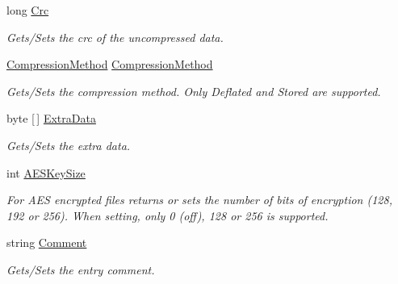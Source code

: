 \begin{DoxyCompactItemize}
long \hyperlink{class_i_c_sharp_code_1_1_sharp_zip_lib_1_1_zip_1_1_zip_entry_ac4fb0517f47ac39edf30324447ae3e5a}{Crc}
\begin{DoxyCompactList}\small\item\em Gets/\+Sets the crc of the uncompressed data. \end{DoxyCompactList}\item 
\hyperlink{namespace_i_c_sharp_code_1_1_sharp_zip_lib_1_1_zip_a90a0e174eca72bf6b490bae40d83a09e}{Compression\+Method} \hyperlink{class_i_c_sharp_code_1_1_sharp_zip_lib_1_1_zip_1_1_zip_entry_a1c4996433278e904adf2b5a6fe8718c0}{Compression\+Method}
\begin{DoxyCompactList}\small\item\em Gets/\+Sets the compression method. Only Deflated and Stored are supported. \end{DoxyCompactList}\item 
byte \mbox{[}$\,$\mbox{]} \hyperlink{class_i_c_sharp_code_1_1_sharp_zip_lib_1_1_zip_1_1_zip_entry_a1536284d87283e6c784f005460f71943}{Extra\+Data}
\begin{DoxyCompactList}\small\item\em Gets/\+Sets the extra data. \end{DoxyCompactList}\item 
int \hyperlink{class_i_c_sharp_code_1_1_sharp_zip_lib_1_1_zip_1_1_zip_entry_a99419532f302d5c7b04d7b50fbceb8f5}{A\+E\+S\+Key\+Size}
\begin{DoxyCompactList}\small\item\em For A\+ES encrypted files returns or sets the number of bits of encryption (128, 192 or 256). When setting, only 0 (off), 128 or 256 is supported. \end{DoxyCompactList}\item 
string \hyperlink{class_i_c_sharp_code_1_1_sharp_zip_lib_1_1_zip_1_1_zip_entry_acb0c7ec544761897d40ab8eec2fbc393}{Comment}
\begin{DoxyCompactList}\small\item\em Gets/\+Sets the entry comment. \end{DoxyCompactList}\item 

\end{DoxyCompactItemize}
